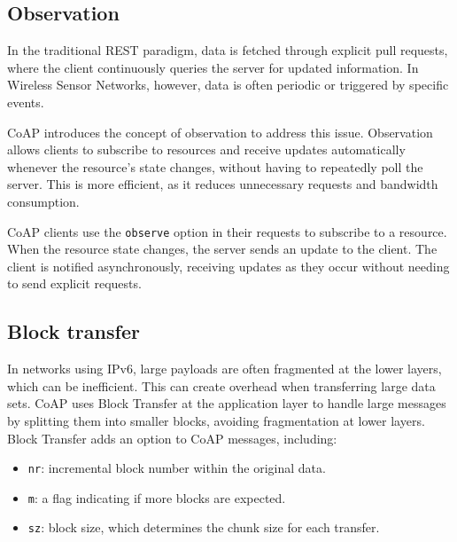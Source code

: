 \subsection{Observation}
In the traditional REST paradigm, data is fetched through explicit pull requests, where the client continuously queries the server for updated information.
In Wireless Sensor Networks, however, data is often periodic or triggered by specific events.

CoAP introduces the concept of observation to address this issue. 
Observation allows clients to subscribe to resources and receive updates automatically whenever the resource's state changes, without having to repeatedly poll the server. 
This is more efficient, as it reduces unnecessary requests and bandwidth consumption.

CoAP clients use the \texttt{observe} option in their requests to subscribe to a resource.
When the resource state changes, the server sends an update to the client.
The client is notified asynchronously, receiving updates as they occur without needing to send explicit requests.

\subsection{Block transfer}
In networks using IPv6, large payloads are often fragmented at the lower layers, which can be inefficient. 
This can create overhead when transferring large data sets.
CoAP uses Block Transfer at the application layer to handle large messages by splitting them into smaller blocks, avoiding fragmentation at lower layers.
Block Transfer adds an option to CoAP messages, including:
\begin{itemize}
    \item \texttt{nr}: incremental block number within the original data.
    \item \texttt{m}: a flag indicating if more blocks are expected.
    \item \texttt{sz}: block size, which determines the chunk size for each transfer.
\end{itemize}

